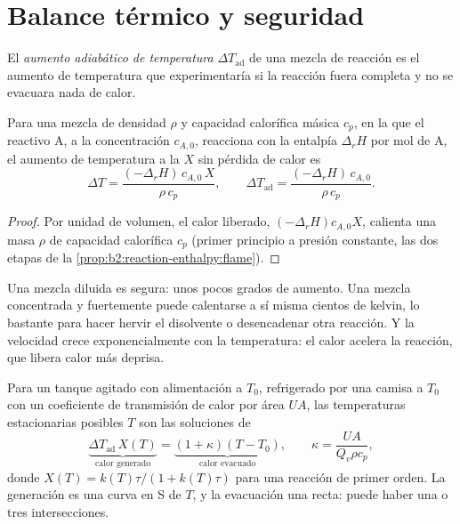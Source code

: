 \section{Balance térmico y seguridad}

\begin{definition}\label{def:b2:continuous-reactors:adiabatic-rise}
El \emph{aumento adiabático de temperatura}
$\Delta T_{\text{ad}}$ de una mezcla de reacción es el aumento de temperatura que
experimentaría si la reacción fuera completa y no se evacuara nada de calor.
\end{definition}

\begin{proposition}\label{prop:b2:continuous-reactors:adiabatic}
Para una mezcla de densidad $\rho$ y capacidad calorífica másica $c_p$, en la que
el reactivo A, a la concentración $c_{A,0}$, reacciona con la entalpía
$\Delta_r H$ por mol de A, el aumento de temperatura a la  $X$ sin
pérdida de calor es
\[
  \Delta T = \frac{(-\Delta_r H)\,c_{A,0}\,X}{\rho\,c_p}, \qquad
  \Delta T_{\text{ad}} = \frac{(-\Delta_r H)\,c_{A,0}}{\rho\,c_p} .
\]
\end{proposition}

\begin{proof}
Por unidad de volumen, el calor liberado, $(-\Delta_r H)c_{A,0}X$, calienta una
masa $\rho$ de capacidad calorífica $c_p$ (primer principio a presión constante, las dos
etapas de la \cref{prop:b2:reaction-enthalpy:flame}).
\end{proof}

Una mezcla diluida es segura: unos pocos grados de aumento. Una mezcla concentrada y fuertemente
 puede calentarse a sí misma cientos de kelvin, lo bastante para hacer hervir el
disolvente o desencadenar otra reacción. Y la velocidad crece exponencialmente con la
temperatura: el calor acelera la reacción, que libera calor más deprisa.

\begin{proposition}\label{prop:b2:continuous-reactors:steady-states}
Para un tanque agitado con alimentación a $T_0$, refrigerado por una camisa a $T_0$ con un
coeficiente de transmisión de calor por área $UA$, las temperaturas estacionarias posibles
$T$ son las soluciones de
\[
  \underbrace{\Delta T_{\text{ad}}\,X(T)}_{\text{calor generado}} =
  \underbrace{(1 + \kappa)(T - T_0)}_{\text{calor evacuado}}, \qquad
  \kappa = \frac{UA}{Q_v\rho c_p},
\]
donde $X(T) = k(T)\tau/(1 + k(T)\tau)$ para una reacción de primer orden. La generación es
una curva en S de $T$, y la evacuación una recta: puede haber una o tres
intersecciones.
\end{proposition}

